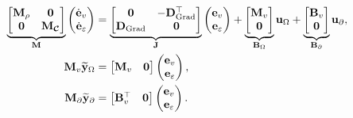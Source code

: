	\begin{equation}\label{eq:findimEl_ex}
	\begin{aligned}
	\underbrace{\begin{bmatrix}
		\mathbf{M}_\rho & \mathbf{0} \\
		\mathbf{0} & \mathbf{M}_{\bm{\mathcal{C}}} \\
		\end{bmatrix}}_{\mathbf{M}}
	\begin{pmatrix}
	\dot{\mathbf{e}}_v \\
	\dot{\mathbf{e}}_\varepsilon \\
	\end{pmatrix} &= \underbrace{\begin{bmatrix}
		\mathbf{0} & -\mathbf{D}_{\operatorname*{Grad}}^\top \\
		\mathbf{D}_{\operatorname*{Grad}} & \mathbf{0} \\
		\end{bmatrix}}_{\mathbf{J}}
	\begin{pmatrix}
	\mathbf{e}_{v} \\
	\mathbf{e}_{\varepsilon} \\
	\end{pmatrix} + 
	\underbrace{\begin{bmatrix}
		\mathbf{M}_{v}\\
		\mathbf{0}\\
		\end{bmatrix}}_{\mathbf{B}_\Omega}
	\mathbf{u}_\Omega
	+ 
	\underbrace{\begin{bmatrix}
		\mathbf{B}_{v}\\
		\mathbf{0}\\
		\end{bmatrix}}_{\mathbf{B}_\partial}
	\mathbf{u}_\partial, \\
	\mathbf{M}_{v} \widetilde{\mathbf{y}}_\Omega &= \begin{bmatrix}
	\mathbf{M}_{v} & \mathbf{0}
	\end{bmatrix} \begin{pmatrix}
	\mathbf{e}_{v} \\
	\mathbf{e}_{\varepsilon} \\
	\end{pmatrix},  \\
	\mathbf{M}_\partial \widetilde{\mathbf{y}}_\partial &= \begin{bmatrix}
	\mathbf{B}_{v}^\top & \mathbf{0}
	\end{bmatrix} \begin{pmatrix}
	\mathbf{e}_{v} \\
	\mathbf{e}_{\varepsilon} \\
	\end{pmatrix}.
	\end{aligned}
	\end{equation}
